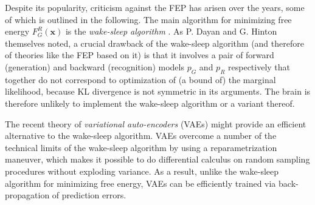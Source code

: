 \documentclass[10pt,letterpaper]{article}
\def\x{\mathbf{x}}
\begin{document}
Despite its popularity, criticism against the FEP has arisen over the years,
some of which is outlined in the following.
The main algorithm for minimizing free energy $F_G^R(\x)$ is the \textit{wake-sleep algorithm}
\citep{dayan1995helmholtz}. As P. Dayan and G. Hinton themselves noted,
a crucial drawback of the wake-sleep algorithm (and therefore of theories like the FEP \citep{friston2010free} based on it) is that it involves a pair
of forward (generation) and backward (recognition) models $p_G$ and $p_R$ respectively that
together do not correspond to optimization of (a bound of) the marginal likelihood,
because KL divergence is not symmetric in its arguments.
The brain is therefore unlikely to implement the wake-sleep algorithm or a variant thereof.

The recent theory of
\textit{variational auto-encoders} (VAEs) \citep{kingma2013auto} might provide an efficient alternative to the wake-sleep algorithm. VAEs
overcome a number of the technical limits of the wake-sleep algorithm
by using a reparametrization maneuver, which makes it possible to do differential calculus on random sampling procedures without exploding variance. As a result, unlike the wake-sleep algorithm
for minimizing free energy, VAEs can be efficiently trained via back-propagation of prediction errors.
\end{document}
